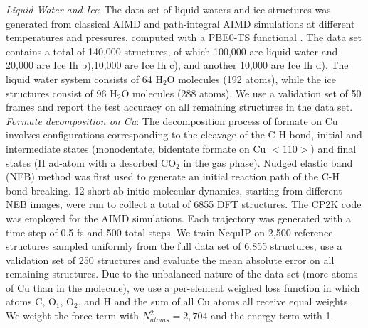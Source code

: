 \documentclass[%
reprint,
superscriptaddress,
nofootinbib,
amsmath,amssymb,
aps,
prl,
]{revtex4-1}
\begin{document}
\textit{Liquid Water and Ice}: The data set of liquid waters and ice structures \cite{deepmd, deepmd_water_paper} was generated from classical AIMD and path-integral AIMD simulations at different temperatures and pressures, computed with a PBE0-TS functional \cite{deepmd}. The data set contains a total of 140,000 structures, of which 100,000 are liquid water and 20,000 are Ice Ih b),10,000 are Ice Ih c), and another 10,000 are Ice Ih d). The liquid water system consists of 64 $\operatorname{H_2O}$ molecules (192 atoms), while the ice structures consist of 96 $\operatorname{H_2O}$ molecules (288 atoms). We use a validation set of 50 frames and report the test accuracy on all remaining structures in the data set. \\

\textit{Formate decomposition on Cu}: The decomposition process of formate on Cu involves configurations corresponding to the cleavage of the C-H bond, initial and intermediate states (monodentate, bidentate formate on Cu $<110>$) and final states (H ad-atom with a desorbed CO$_2$ in the gas phase). Nudged elastic band (NEB) method was first used to generate an initial reaction path of the C-H bond breaking. 12 short ab initio molecular dynamics, starting from different NEB images, were run to collect a total of 6855 DFT structures. The CP2K \cite{Hutter_Iannuzzi_Schiffmann_VandeVondele_2014} code was employed for the AIMD simulations. Each trajectory was generated with a time step of 0.5 fs and 500 total steps. We train NequIP on 2,500 reference structures sampled uniformly from the full data set of 6,855 structures, use a validation set of 250 structures and evaluate the mean absolute error on all remaining structures. Due to the unbalanced nature of the data set (more atoms of Cu than in the molecule), we use a per-element weighed loss function in which atoms C, $\operatorname{O_1}$, $\operatorname{O_2}$, and H and the sum of all Cu atoms all receive equal weights. We weight the force term with $N_{atoms}^2 = 2,704$ and the energy term with 1. \\
\end{document}
